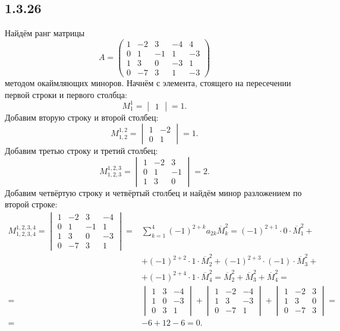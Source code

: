 \subsection{1.3.26}

Найдём ранг матрицы
\[
A=
\begin{pmatrix}
	1 & -2 & 3 & -4 & 4 \\
	0 & 1 & -1 & 1 & -3 \\
	1 & 3 & 0 & -3 & 1 \\
	0 & -7 & 3 & 1 & -3
\end{pmatrix}
\]
методом окаймляющих миноров. Начнём с элемента, стоящего на пересечении первой строки и первого столбца:
\[
M_1^1=
\begin{vmatrix}
	1
\end{vmatrix}
=1.
\]
Добавим вторую строку и второй столбец:
\[
M_{1,2}^{1,2}=
\begin{vmatrix}
	1 & -2 \\
	0 & 1
\end{vmatrix}
=1.
\]
Добавим третью строку и третий столбец:
\[
M_{1,2,3}^{1,2,3}=
\begin{vmatrix}
	1 & -2 & 3 \\
	0 & 1 & -1 \\
	1 & 3 & 0
\end{vmatrix}
=2.
\]
Добавим четвёртую строку и четвёртый столбец и найдём минор разложением по второй строке:
\[
\begin{split}
M_{1,2,3,4}^{1,2,3,4}=
\begin{vmatrix}
	1 & -2 & 3 & -4 \\
	0 & 1 & -1 & 1 \\
	1 & 3 & 0 & -3 \\
	0 & -7 & 3 & 1
\end{vmatrix}
= & \sum_{k=1}^4(-1)^{2+k}a_{2k}\overline{M}_k^2=(-1)^{2+1}\cdot0\cdot\overline{M}_1^2+ \\
& +(-1)^{2+2}\cdot1\cdot\overline{M}_2^2+(-1)^{2+3}\cdot(-1)\cdot\overline{M}_3^2+ \\
& +(-1)^{2+4}\cdot1\cdot\overline{M}_4^2=\overline{M}_2^2+\overline{M}_3^2+\overline{M}_4^2= \\
= &
\begin{vmatrix}
	1 & 3 & -4 \\
	1 & 0 & -3 \\
	0 & 3 & 1
\end{vmatrix}
+
\begin{vmatrix}
	1 & -2 & -4 \\
	1 & 3 & -3 \\
	0 & -7 & 1
\end{vmatrix}
+
\begin{vmatrix}
	1 & -2 & 3 \\
	1 & 3 & 0 \\
	0 & -7 & 3
\end{vmatrix}
= \\
= & -6+12-6=0.
\end{split}
\]
